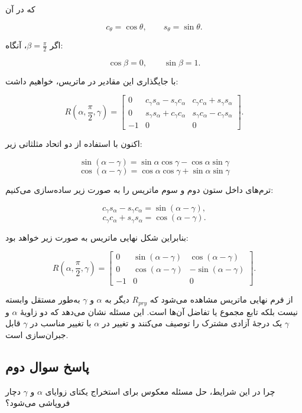 \documentclass{article}
\begin{document}
که در آن

\[
c_\theta = \cos\theta,
\qquad
s_\theta = \sin\theta.
\]

اگر $\beta = \frac{\pi}{2}$، آنگاه: 

\[
\cos\beta = 0,
\qquad
\sin\beta = 1.
\]

با جایگذاری این مقادیر در ماتریس، خواهیم داشت:

\[
R\!\left(\alpha,\frac{\pi}{2},\gamma\right)=
\begin{bmatrix}
	0 &
	c_\gamma s_\alpha - s_\gamma c_\alpha &
	c_\gamma c_\alpha + s_\gamma s_\alpha
	\\[4pt]
	0 &
	s_\gamma s_\alpha + c_\gamma c_\alpha &
	s_\gamma c_\alpha - c_\gamma s_\alpha
	\\[4pt]
	-1 & 0 & 0
\end{bmatrix}.
\]

اکنون با استفاده از دو اتحاد مثلثاتی زیر:

\[
\sin(\alpha-\gamma)=\sin\alpha\cos\gamma-\cos\alpha\sin\gamma
\]
\[
\cos(\alpha-\gamma)=\cos\alpha\cos\gamma+\sin\alpha\sin\gamma
\]

ترم‌های داخل ستون دوم و سوم ماتریس را به صورت زیر ساده‌سازی می‌کنیم:

\[
c_\gamma s_\alpha - s_\gamma c_\alpha = \sin(\alpha-\gamma),
\]
\[
c_\gamma c_\alpha + s_\gamma s_\alpha = \cos(\alpha-\gamma).
\]

بنابراین شکل نهایی ماتریس به صورت زیر خواهد بود:

\[
R\!\left(\alpha,\frac{\pi}{2},\gamma\right)=
\begin{bmatrix}
	0 & \sin(\alpha-\gamma) & \cos(\alpha-\gamma)
	\\[4pt]
	0 & \cos(\alpha-\gamma) & -\sin(\alpha-\gamma)
	\\[4pt]
	-1 & 0 & 0
\end{bmatrix}.
\]

از فرم نهایی ماتریس مشاهده می‌شود که $R_{pry}$ دیگر به $\alpha$ و $\gamma$ به‌طور مستقل وابسته نیست بلکه تابع مجموع یا تفاضل آن‌ها است. این مسئله نشان می‌دهد که دو زاویهٔ $\alpha$ و $\gamma$ یک درجهٔ آزادی مشترک را توصیف می‌کنند و تغییر در $\alpha$ با تغییر مناسب در $\gamma$ قابل جبران‌سازی است.

\subsection{پاسخ سوال دوم }

چرا در این شرایط، حل مسئله معکوس برای استخراج یکتای زوایای $\alpha$ و $\gamma$ دچار فروپاشی می‌شود؟
\end{document}
